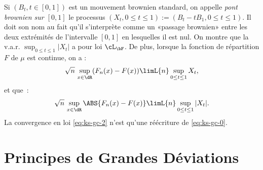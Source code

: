 Si $(B_t,t\in[0,1])$ est un mouvement brownien standard, on appelle \emph{pont
  brownien sur $[0,1]$} le processus $(X_t,0\leq t\leq 1):=(B_t-tB_1,0\leq
t\leq 1)$. Il doit son nom au fait qu'il s'interprète comme un «passage
brownien» entre les deux extrémités de l'intervalle $[0,1]$ en lesquelles il
est nul. On montre que la v.a.r. $\sup_{0\leq t\leq1}|X_t|$ a pour loi
$\cL_{\bF}$. De plus, lorsque la fonction de répartition $F$ de $\mu$ est
continue, on a :
\begin{equation}\label{eq:ks-gc-1}
\sqrt{n}\,\sup_{x \in \dR}(F_n(x)-F(x))\limL{n}\sup_{0\leq t\leq1}X_t,
\end{equation}
et que~:
\begin{equation}\label{eq:ks-gc-2}
\sqrt{n}\,\sup_{x \in \dR}\ABS{F_n(x)-F(x)}\limL{n}\sup_{0\leq t\leq1}|X_t|.
\end{equation}
La convergence en loi \eqref{eq:ks-gc-2} n'est qu'une réécriture de
\eqref{eq:ks-gc-0}. 


%
\section{Principes de Grandes Déviations}\label{se:pgd}
%

